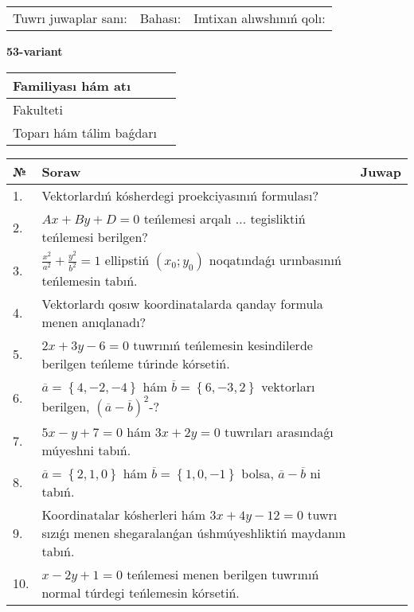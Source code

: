 \documentclass{article}
\begin{document}
\vspace{1cm}

\begin{tabular}{lll}
Tuwrı juwaplar sanı: \underline{\hspace{1.5cm}} & 
Bahası: \underline{\hspace{1.5cm}} & 
Imtixan alıwshınıń qolı: \underline{\hspace{2cm}} \\
\end{tabular}

\egroup

\newpage


\textbf{53-variant}\\

\bgroup
\def\arraystretch{1.6} %

\begin{tabular}{|m{5.7cm}|m{9.5cm}|}
\hline
Familiyası hám atı & \\
\hline
Fakulteti  & \\
\hline
Toparı hám tálim baǵdarı  & \\
\hline
\end{tabular}

\vspace{1cm}

\begin{tabular}{|m{0.7cm}|m{10cm}|m{4cm}|}
\hline
№ & Soraw & Juwap \\
\hline
1. & Vektorlardıń kósherdegi proekciyasınıń formulası? &  \\
\hline
2. & $Ax+By+D=0$ teńlemesi arqalı ... tegisliktiń teńlemesi berilgen? &  \\
\hline
3. & $\frac{x^2}{a^2}+\frac{y^2}{b^2}=1$ ellipstiń $(x_0;y_0)$ noqatındaǵı urınbasınıń teńlemesin tabıń. &  \\
\hline
4. & Vektorlardı qosıw koordinatalarda qanday formula menen anıqlanadı? &  \\
\hline
5. & $2x+3y-6=0$ tuwrınıń teńlemesin kesindilerde berilgen teńleme túrinde kórsetiń. &  \\
\hline
6. & $\overline{a}=\left\{ 4,-2,-4 \right\}$ hám $\overline{b}=\left\{ 6,-3, 2 \right\}$ vektorları berilgen, $(\overline{a}-\overline{b}) ^{2}$-? &  \\
\hline
7. & $5x-y+7=0$ hám $3x+2y=0$ tuwrıları arasındaǵı múyeshni tabıń. &  \\
\hline
8. & $\overline{a}=\left\{ 2, 1, 0 \right\}$ hám $\overline{b}=\left\{ 1, 0,-1 \right\}$ bolsa, $\overline{a}-\overline{b}$ ni tabıń. &  \\
\hline
9. & Koordinatalar kósherleri hám $ 3x+4y-12=0 $ tuwrı sızıǵı menen shegaralanǵan úshmúyeshliktiń maydanın tabıń. &  \\
\hline
10. & $x-2y+1=0$ teńlemesi menen berilgen tuwrınıń normal túrdegi teńlemesin kórsetiń. &  \\
\hline
\end{tabular}
\end{document}
